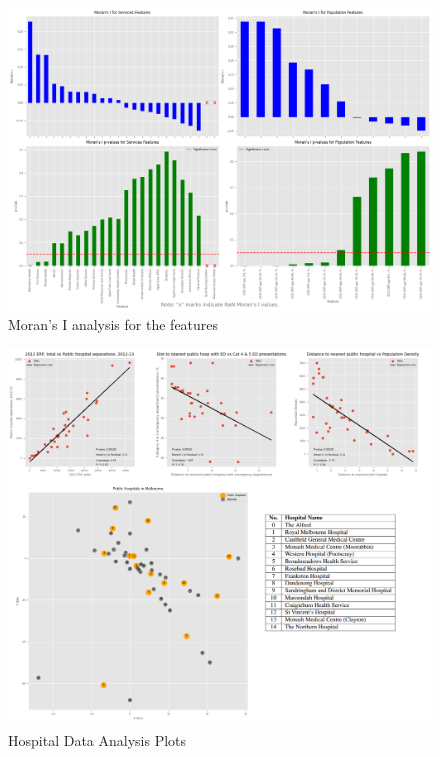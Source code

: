 \documentclass[
	a4paper, %
	10pt, %
	unnumberedsections, %
	twoside, %
]{LTJournalArticle}
\begin{document}
\begin{figure}
  \vspace{-0.6cm}
  \includegraphics[scale=0.5]{moran_i_analysis.png}
  \caption{Moran's I analysis for the features}
  \label{fig:moran_part_A}
\end{figure}





\begin{figure}
  \centering
  \includegraphics[scale=0.5]{hosp_full_with_labels.png}
  \caption{Hospital Data Analysis Plots}
  \label{fig:hosp_fig}
\end{figure}
\end{document}
